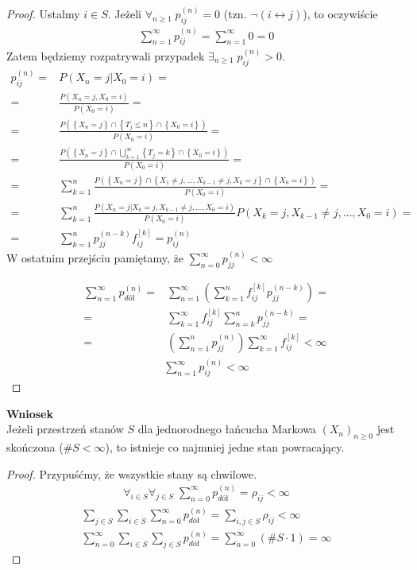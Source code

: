 \begin{proof}
Ustalmy $ i\in S $. Jeżeli $ \forall_{n\ge 1}\;p_{ij}^{(n)}=0 $ (tzn. $ \neg\left(i\longleftrightarrow j\right) $), to oczywiście
\begin{gather*}
\sum_{n=1}^{\infty }p_{ij}^{(n)}=\sum_{n=1}^{\infty }0=0
\end{gather*}
Zatem będziemy rozpatrywali przypadek $ \exists_{n\ge 1}\;p_{ij}^{(n)}>0 $.
\begin{align*}
p_{ij}^{(n)}
=&
P\left(X_n=j|X_0=i\right)
=\\=&
\frac{P\left(X_n=j,X_0=i\right)}{P\left(X_0=i\right)}
=\\=&
\frac{P\left(\left\{X_n=j\right\}\cap\left\{T_j\le n\right\}\cap \left\{X_0=i\right\}\right)}{P\left(X_0=i\right)}
=\\=&
\frac{P\left(\left\{X_n=j\right\}\cap\bigcup\limits_{k=1}^\infty \left\{T_j=k\right\}\cap \left\{X_0=i\right\}\right)}{P\left(X_0=i\right)}
=\\=&
\sum_{k=1}^{n }\frac{P\left(\left\{X_n=j\right\}\cap \left\{X_1\neq j,\dots,X_{k-1}\neq j,X_k=j\right\}\cap \left\{X_0=i\right\}\right)}{P\left(X_0=i\right)}
=\\=&
\sum_{k=1}^{n}\frac{P\left(X_n=j|X_k=j,X_{k-1}\neq j,\dots,X_0=i\right)}{P\left(X_0=i\right)}P\left(X_k=j,X_{k-1}\neq j,\dots,X_0=i\right)
=\\=&
\sum_{k=1}^{n}p_{jj}^{(n-k)}f_{ij}^{[k]}=p_{ij}^{(n)}
\end{align*}
W ostatnim przejściu pamiętamy, że $ \sum_{n=0}^{\infty }p_{jj}^{(n)}<\infty  $

\begin{align*}
\sum_{n=1}^{\infty }p_{dół}^{(n)}
=&
\sum_{n=1}^{\infty }\left(\sum_{k=1}^{n}f_{ij}^{[k]}p_{jj}^{(n-k)}\right)
=\\=&
\sum_{k=1}^{\infty }f_{ij}^{[k]}\sum_{n=k}^{n}p_{jj}^{(n-k)}
=\\=&
\left(\sum_{n=1}^{n}p_{jj}^{(n)}\right)\sum_{k=1}^{\infty }f_{ij}^{[k]}<\infty 
\end{align*}
\begin{gather*}
\sum_{n=1}^{\infty }p_{ij}^{(n)}<\infty 
\end{gather*}
\end{proof}
\textbf{Wniosek}\\
Jeżeli przestrzeń stanów $ S $ dla jednorodnego łańcucha Markowa $ \left(X_n\right)_{n\ge 0} $ jest skończona ($ \#S<\infty  $), to istnieje co najmniej jedne stan powracający.
\begin{proof}
Przypuśćmy, że wszystkie stany są chwilowe.
\begin{gather*}
\forall_{i\in S}\forall_{j\in S}\;\sum_{n=0}^{\infty }p_{dół}^{(n)}=\rho_{ij}<\infty 
\end{gather*}
\begin{gather*}
\sum_{j\in S}\sum_{i\in S}\sum_{n=0}^{\infty }p_{dół}^{(n)}=\sum_{i,j\in S}\rho_{ij}<\infty \\
\sum_{n=0}^{\infty }\sum_{i\in S}\sum_{j\in S}p_{dół}^{(n)}=\sum_{n=0}^{\infty }\left(\#S\cdot 1\right)=\infty 
\end{gather*}
\end{proof}
